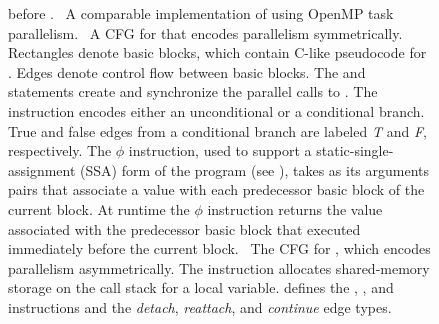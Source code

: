 \begin{figure}[h!]
{    before .  ~A comparable implementation
    of  using OpenMP task parallelism.  ~A CFG
    for  that encodes parallelism symmetrically.  Rectangles
    denote basic blocks, which contain C-like pseudocode for
    .  Edges denote control flow between basic blocks.  The
     and  statements create and
    synchronize the parallel calls to .  The 
    instruction encodes either an unconditional or a conditional
    branch.  True and false edges from a conditional branch are
    labeled \textit{T} and \textit{F}, respectively.  The $\phi$
    instruction, used to support a static-single-assignment (SSA) form
    of the program (see ), takes as its arguments pairs
    that associate a value with each predecessor basic block of the
    current block.  At runtime the $\phi$ instruction returns the
    value associated with the predecessor basic block that executed
    immediately before the current block.  ~The \tapir
    CFG for , which encodes parallelism asymmetrically.  The
     instruction allocates shared-memory storage on the
    call stack for a local variable.   defines the
    , , and  instructions and
    the \textit{detach}, \textit{reattach}, and \textit{continue} edge
    types.}
  \label{fig:cfg}
\vspace{-.4cm}
\end{figure}

